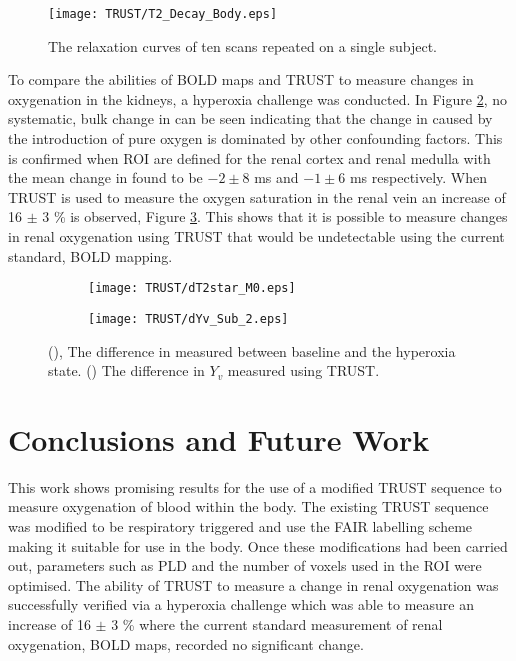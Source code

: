 \begin{figure}[H]
	\centering
	\texttt{[image: TRUST/T2\_Decay\_Body.eps]}
	\caption{The \ttwo relaxation curves of ten scans repeated on a single subject.}
	\label{fig:T2_Decay_Body}	
\end{figure}

To compare the abilities of \ac{BOLD} \ttwostar maps and \ac{TRUST} to measure changes in oxygenation in the kidneys, a hyperoxia challenge was conducted. In Figure \ref{fig:dT2star}, no systematic, bulk change in \ttwostar can be seen indicating that the change in \ttwostar caused by the introduction of pure oxygen is dominated by other confounding factors. This is confirmed when \ac{ROI} are defined for the renal cortex and renal medulla with the mean change in \ttwostar found to be $-2 \pm 8$ ms and $-1 \pm 6$ ms respectively. When \ac{TRUST} is used to measure the oxygen saturation in the renal vein an increase of 16 $\pm$ 3 \% is observed, Figure \ref{fig:dYv}. This shows that it is possible to measure changes in renal oxygenation using \ac{TRUST} that would be undetectable using the current standard, \ac{BOLD} \ttwostar mapping.
\begin{figure}[H]
	\centering
	\begin{subfigure}[c]{0.47\textwidth}
		\centering
		\texttt{[image: TRUST/dT2star\_M0.eps]}
		\caption{}
		\label{fig:dT2star}
	\end{subfigure}
	\hfill
	\begin{subfigure}[c]{0.47\textwidth}
		\centering
		\texttt{[image: TRUST/dYv\_Sub\_2.eps]}
		\caption{}
		\label{fig:dYv}
	\end{subfigure}
	\caption{(), The difference in \ttwostar measured between baseline and the hyperoxia state. () The difference in $Y_v$ measured using \ac{TRUST}.}
	\label{fig:oxygen_chalenge_results}
\end{figure}

\newpage
\section{Conclusions and Future Work}

This work shows promising results for the use of a modified \ac{TRUST} sequence to measure oxygenation of blood within the body. The existing \ac{TRUST} sequence was modified to be respiratory triggered and use the \ac{FAIR} labelling scheme making it suitable for use in the body. Once these modifications had been carried out, parameters such as \ac{PLD} and the number of voxels used in the \ac{ROI} were optimised. The ability of \ac{TRUST} to measure a change in renal oxygenation was successfully verified via a hyperoxia challenge which was able to measure an increase of 16 $\pm$ 3 \% where the current standard measurement of renal oxygenation, \ac{BOLD} \ttwostar maps, recorded no significant change.

